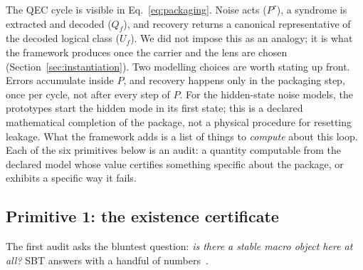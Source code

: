 The QEC cycle is visible in Eq.~\eqref{eq:packaging}. Noise acts ($P^\tau$), a syndrome is extracted and decoded ($Q_f$), and recovery returns a canonical representative of the decoded logical class ($U_f$). We did not impose this as an analogy; it is what the framework produces once the carrier and the lens are chosen (Section~\ref{sec:instantiation}). Two modelling choices are worth stating up front. Errors accumulate inside $P$, and recovery happens only in the packaging step, once per cycle, not after every step of $P$. For the hidden-state noise models, the prototypes start the hidden mode in its first state; this is a declared mathematical completion of the package, not a physical procedure for resetting leakage. What the framework adds is a list of things to \emph{compute} about this loop. Each of the six primitives below is an audit: a quantity computable from the declared model whose value certifies something specific about the package, or exhibits a specific way it fails.

\subsection{Primitive 1: the existence certificate}
\label{sec:sbt-existence}

The first audit asks the bluntest question: \emph{is there a stable macro object here at all?} SBT answers with a handful of numbers~\cite{sbt-f1,sbt-f3,sbt-xor}.

